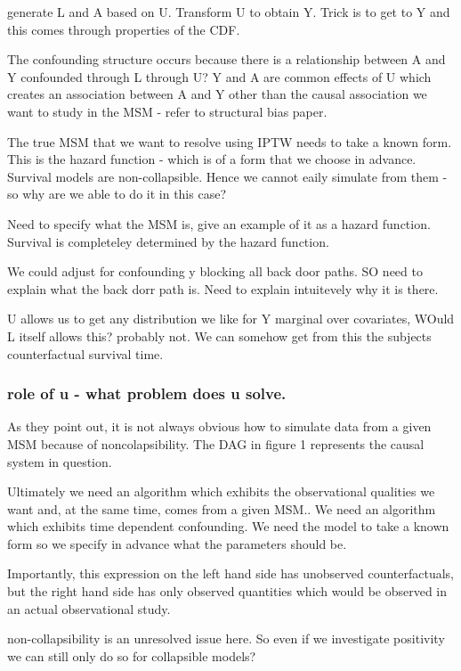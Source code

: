 \documentclass[11pt]{article}
\begin{document}
generate L and A based on U. Transform U to obtain Y. Trick is to get to
Y and this comes through properties of the CDF.

The confounding structure occurs because there is a relationship between
A and Y confounded through L through U? Y and A are common effects of U
which creates an association between A and Y other than the causal
association we want to study in the MSM - refer to structural bias
paper.

The true MSM that we want to resolve using IPTW needs to take a known
form. This is the hazard function - which is of a form that we choose in
advance. Survival models are non-collapsible. Hence we cannot eaily
simulate from them - so why are we able to do it in this case?

Need to specify what the MSM is, give an example of it as a hazard
function. Survival is completeley determined by the hazard function.

We could adjust for confounding y blocking all back door paths. SO need
to explain what the back dorr path is. Need to explain intuitevely why
it is there.

U allows us to get any distribution we like for Y marginal over
covariates, WOuld L itself allows this? probably not. We can somehow get
from this the subjects counterfactual survival time.

\subsubsection{role of u - what problem does u
solve.}\label{role-of-u---what-problem-does-u-solve.}

As they point out, it is not always obvious how to simulate data from a
given MSM because of noncolapsibility. The DAG in figure 1 represents
the causal system in question.

Ultimately we need an algorithm which exhibits the observational
qualities we want and, at the same time, comes from a given MSM.. We
need an algorithm which exhibits time dependent confounding. We need the
model to take a known form so we specify in advance what the parameters
should be.

Importantly, this expression on the left hand side has unobserved
counterfactuals, but the right hand side has only observed quantities
which would be observed in an actual observational study.

non-collapsibility is an unresolved issue here. So even if we
investigate positivity we can still only do so for collapsible models?
\end{document}
